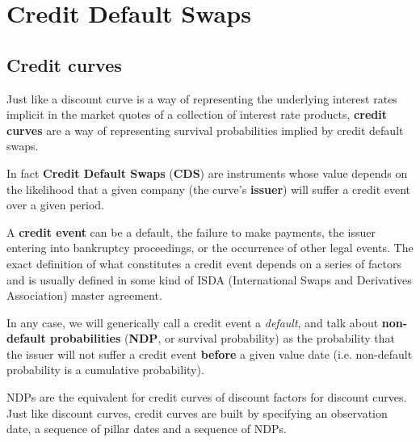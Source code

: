 \chapter{Credit Default Swaps}\label{credit_default_swaps}

\section{Credit curves}\label{credit-curves}

Just like a discount curve is a way of representing the underlying interest rates implicit in the market quotes of a collection of interest rate products, \textbf{credit curves} are a way of representing survival probabilities implied by credit default swaps.

In fact \textbf{Credit Default Swaps} (\textbf{CDS}) are instruments whose value depends on the likelihood that a given company (the curve's \textbf{issuer}) will suffer a credit event over a given period.

A \textbf{credit event} can be a default, the failure to make payments, the issuer entering into bankruptcy proceedings, or the occurrence of other legal events. The exact definition of what constitutes a credit event depends on a series of factors and is usually defined in some kind of ISDA (International Swaps and Derivatives Association) master agreement.

In any case, we will generically call a credit event a \emph{default}, and talk about \textbf{non-default probabilities} (\textbf{NDP}, or survival probability) as the probability that the issuer will not suffer a credit event \textbf{before} a given value date (i.e. non-default probability is a cumulative probability).

NDPs are the equivalent for credit curves of discount factors for discount curves. Just like discount curves, credit curves are built by specifying an observation date, a sequence of pillar dates and a sequence of NDPs. 

